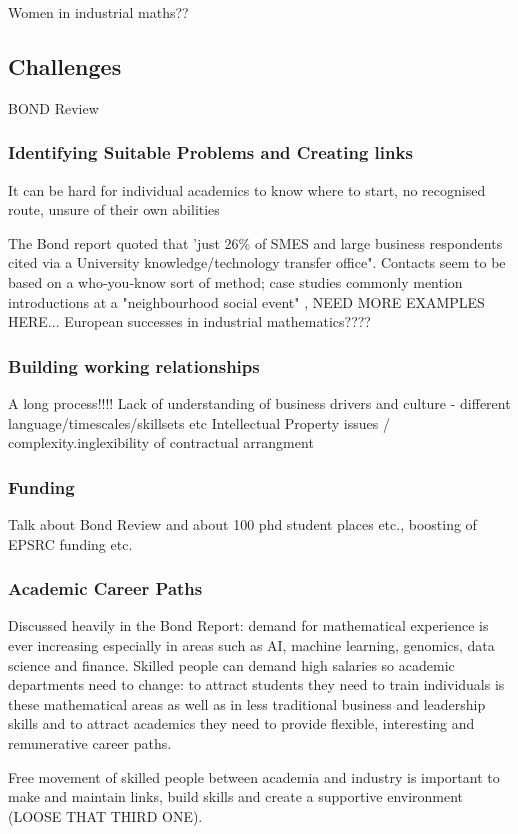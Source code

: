 \documentclass[11pt]{article} %
\begin{document}
	Women in industrial maths?? 
	\subsection{Challenges} 
	BOND Review
	
	\subsubsection{Identifying Suitable Problems and Creating links} 
	
	It can be hard for individual academics to know where to start, no recognised route, unsure of their own abilities 
	
	The Bond report quoted that 'just 26\% of SMES and large business respondents cited via a University knowledge/technology transfer office". Contacts seem to be based on a who-you-know sort of method; case studies commonly mention introductions at a "neighbourhood social event" \cite{Stockie2015}, NEED MORE EXAMPLES HERE... European successes in industrial mathematics????
	\subsubsection{Building working relationships}
	A long process!!!!
	Lack of understanding of business drivers and culture - different language/timescales/skillsets etc 
	Intellectual Property issues / complexity.inglexibility of contractual arrangment
	\subsubsection{Funding} 
	Talk about Bond Review and about 100 phd student places etc., boosting of EPSRC funding etc. 
	\subsubsection{Academic Career Paths} 
	Discussed heavily in the Bond Report: demand for mathematical experience is ever increasing especially in areas such as AI, machine learning, genomics, data science and finance. Skilled people can demand high salaries so academic departments need to change: to attract students they need to train individuals is these mathematical areas as well as in less traditional business and leadership skills and to attract academics they need to provide flexible, interesting  and remunerative career paths. 
	
	Free movement of skilled people between academia and industry is important to make and maintain links, build skills and create a supportive environment (LOOSE THAT THIRD ONE). 
	
\end{document}
